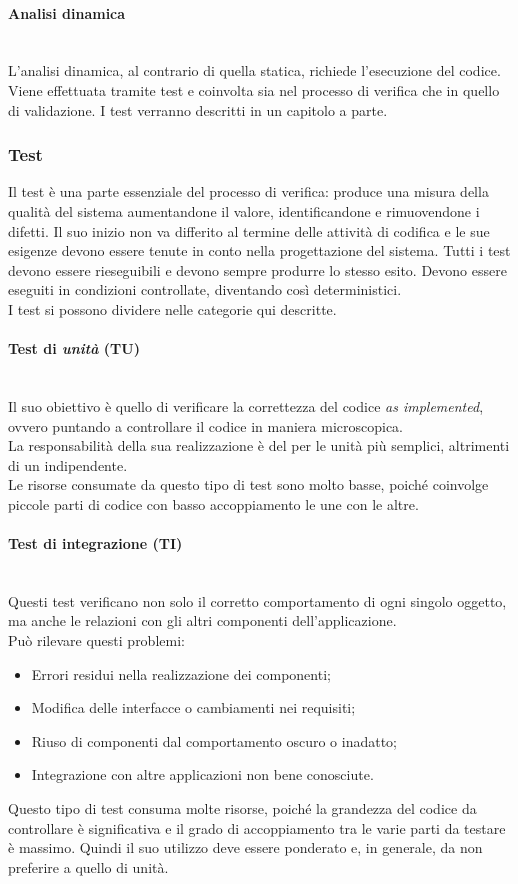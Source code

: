 	\paragraph{Analisi dinamica}
	~\\L'analisi dinamica, al contrario di quella statica, richiede l'esecuzione del codice.
	Viene effettuata tramite test e coinvolta sia nel processo di verifica che in quello di validazione.
	I test verranno descritti in un capitolo a parte.
	\subsubsection{Test}
	Il test è una parte essenziale del processo di verifica: produce una misura della qualità del sistema
	aumentandone il valore, identificandone e rimuovendone i difetti. Il suo inizio non va differito
	al termine delle attività di codifica e le sue esigenze devono essere tenute in conto nella progettazione del sistema. Tutti i test devono essere rieseguibili e devono sempre produrre lo stesso esito. Devono essere eseguiti in condizioni controllate, diventando così deterministici.
	~\\I test si possono dividere nelle categorie qui descritte.
		\paragraph{\textbf{Test di \emph{unità}} \textbf{(TU)}}
		~\\Il suo obiettivo è quello di verificare la correttezza del codice \emph{as implemented}, ovvero
		puntando a controllare il codice in maniera microscopica.
		\\La responsabilità della sua realizzazione è del \progr{} per le unità più semplici, altrimenti
		di un \ver{} indipendente.
		\\Le risorse consumate da questo tipo di test sono molto basse, poiché coinvolge piccole parti di codice con basso accoppiamento le une con le altre. 
		\paragraph{\textbf{Test di integrazione (TI)}}
		~\\Questi test verificano non solo il corretto comportamento di ogni singolo oggetto, 
		ma anche le relazioni con gli altri componenti dell'applicazione.
		~\\Può rilevare questi problemi:
		\begin{itemize}
			\item Errori residui nella realizzazione dei componenti;
			\item Modifica delle interfacce o cambiamenti nei requisiti;
			\item Riuso di componenti dal comportamento oscuro o inadatto;
			\item Integrazione con altre applicazioni non bene conosciute.
		\end{itemize}
		Questo tipo di test consuma molte risorse, poiché la grandezza del codice da controllare è 
		significativa e	il grado di accoppiamento tra le varie parti da testare è massimo. 
		Quindi il suo utilizzo deve essere ponderato e, in generale, da non preferire a quello di unità.
